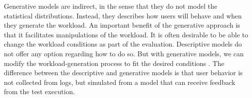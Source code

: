Generative models are indirect, in the sense that they do not model the statistical distributions. Instead, they describes how users will behave and when they generate the workload. An important benefit of the generative approach is
that it facilitates manipulations of the workload. It is often desirable to be able to change the workload conditions as part of the evaluation. Descriptive models do not offer any option regarding how to do so. But with generative models, we can modify the workload-generation process to fit the desired conditions \cite{DiLucca2006}. The difference between the descriptive and generative models is that user behavior is not collected from logs, but simulated from a model that can receive feedback from the test execution.
%
%